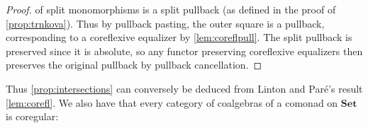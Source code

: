 \documentclass[11pt, oneside, article]{memoir}
\theoremstyle{plain}
\theoremstyle{definition}
\theoremstyle{remark}
\newcommand{\imp}{\Rightarrow}
\newcommand{\namedcat}[1]{\mathbf{#1}}
\newcommand{\cat}[1]{\mathbf{#1}}
\newcommand{\Set}{\namedcat{Set}}
\newcommand{\xS}{S}
\newcommand{\xT}{T}
\newcommand{\xU}{U}
\newcommand{\bC}{\cat{C}}
\newcommand{\bJ}{\cat{J}}
\begin{document}
\begin{proof}
  of split monomorphisms is a split pullback (as defined in the proof
  of \cref{prop:trnkova}). Thus by pullback pasting, the outer square
  is a pullback, corresponding to a coreflexive equalizer by
  \cref{lem:coreflpull}. The split pullback is preserved since it is
  absolute, so any functor preserving coreflexive equalizers then
  preserves the original pullback by pullback cancellation.
\end{proof}

Thus \cref{prop:intersections} can conversely be deduced from Linton and
Par\'e's result \cref{lem:corefl}.
We also have that every category of coalgebras of a comonad on $\Set$
is coregular:
\end{document}
